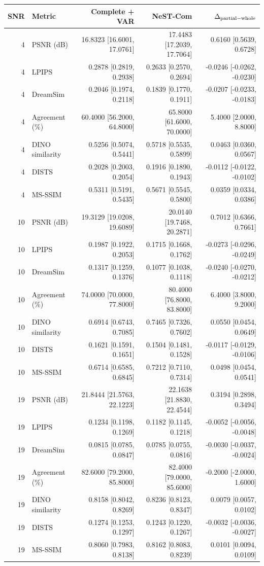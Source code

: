 \begin{tabular}{rlrrr}
\toprule
SNR & Metric & Complete + VAR & NeST-Com & $\Delta_{\rm partial-whole}$ \\
\midrule
4 & PSNR (dB) & 16.8323 [16.6001, 17.0761] & 17.4483 [17.2039, 17.7064] & 0.6160 [0.5639, 0.6728] \\
4 & LPIPS & 0.2878 [0.2819, 0.2938] & 0.2633 [0.2570, 0.2694] & -0.0246 [-0.0262, -0.0230] \\
4 & DreamSim & 0.2046 [0.1974, 0.2118] & 0.1839 [0.1770, 0.1911] & -0.0207 [-0.0233, -0.0183] \\
4 & Agreement (\%) & 60.4000 [56.2000, 64.8000] & 65.8000 [61.6000, 70.0000] & 5.4000 [2.0000, 8.8000] \\
4 & DINO similarity & 0.5256 [0.5074, 0.5441] & 0.5718 [0.5535, 0.5899] & 0.0463 [0.0360, 0.0567] \\
4 & DISTS & 0.2028 [0.2003, 0.2054] & 0.1916 [0.1890, 0.1943] & -0.0112 [-0.0122, -0.0102] \\
4 & MS-SSIM & 0.5311 [0.5191, 0.5435] & 0.5671 [0.5545, 0.5800] & 0.0359 [0.0334, 0.0386] \\
10 & PSNR (dB) & 19.3129 [19.0208, 19.6089] & 20.0140 [19.7468, 20.2871] & 0.7012 [0.6366, 0.7661] \\
10 & LPIPS & 0.1987 [0.1922, 0.2053] & 0.1715 [0.1668, 0.1762] & -0.0273 [-0.0296, -0.0249] \\
10 & DreamSim & 0.1317 [0.1259, 0.1376] & 0.1077 [0.1038, 0.1118] & -0.0240 [-0.0270, -0.0212] \\
10 & Agreement (\%) & 74.0000 [70.0000, 77.8000] & 80.4000 [76.8000, 83.8000] & 6.4000 [3.8000, 9.2000] \\
10 & DINO similarity & 0.6914 [0.6743, 0.7085] & 0.7465 [0.7326, 0.7602] & 0.0550 [0.0454, 0.0649] \\
10 & DISTS & 0.1621 [0.1591, 0.1651] & 0.1504 [0.1481, 0.1528] & -0.0117 [-0.0129, -0.0106] \\
10 & MS-SSIM & 0.6714 [0.6585, 0.6845] & 0.7212 [0.7110, 0.7314] & 0.0498 [0.0454, 0.0541] \\
19 & PSNR (dB) & 21.8444 [21.5763, 22.1223] & 22.1638 [21.8830, 22.4544] & 0.3194 [0.2898, 0.3494] \\
19 & LPIPS & 0.1234 [0.1198, 0.1269] & 0.1182 [0.1145, 0.1218] & -0.0052 [-0.0056, -0.0048] \\
19 & DreamSim & 0.0815 [0.0785, 0.0847] & 0.0785 [0.0755, 0.0816] & -0.0030 [-0.0037, -0.0024] \\
19 & Agreement (\%) & 82.6000 [79.2000, 85.8000] & 82.4000 [79.0000, 85.6000] & -0.2000 [-2.0000, 1.6000] \\
19 & DINO similarity & 0.8158 [0.8042, 0.8269] & 0.8236 [0.8123, 0.8347] & 0.0079 [0.0057, 0.0102] \\
19 & DISTS & 0.1274 [0.1253, 0.1297] & 0.1243 [0.1220, 0.1267] & -0.0032 [-0.0036, -0.0027] \\
19 & MS-SSIM & 0.8060 [0.7983, 0.8138] & 0.8162 [0.8083, 0.8239] & 0.0101 [0.0094, 0.0109] \\
\bottomrule
\end{tabular}
